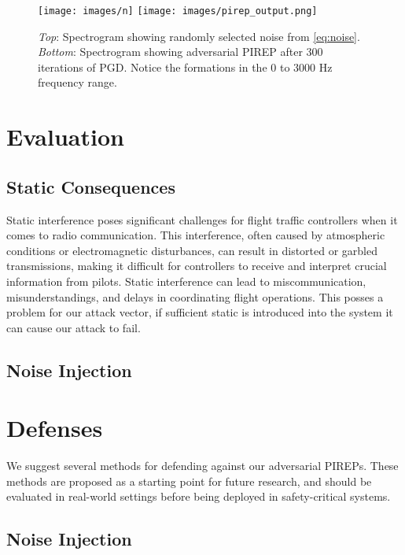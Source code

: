 \begin{figure}[h]
  \centering
  \texttt{[image: images/n]}
  \texttt{[image: images/pirep\_output.png]}
  \caption{\textit{Top}: Spectrogram showing randomly selected noise from \autoref{eq:noise}. \textit{Bottom}: Spectrogram showing adversarial PIREP after 300 iterations of PGD. Notice the formations in the 0 to 3000 Hz frequency range.}
  \label{fig:spectrograms}
\end{figure}

\section{Evaluation}

\subsection{Static Consequences}

Static interference poses significant challenges for flight traffic controllers when it comes to radio communication. 
This interference, often caused by atmospheric conditions or electromagnetic disturbances, can result in distorted
or garbled transmissions, making it difficult for controllers to receive and interpret crucial information from pilots. 
Static interference can lead to miscommunication, misunderstandings, and delays in coordinating flight operations. 
This posses a problem for our attack vector, if sufficient static is introduced into the system it can cause our attack to fail.

\subsection{Noise Injection}

\section{Defenses}

We suggest several methods for defending against our adversarial PIREPs. These
methods are proposed as a starting point for future research, and should be
evaluated in real-world settings before being deployed in safety-critical
systems.

\subsection{Noise Injection}

